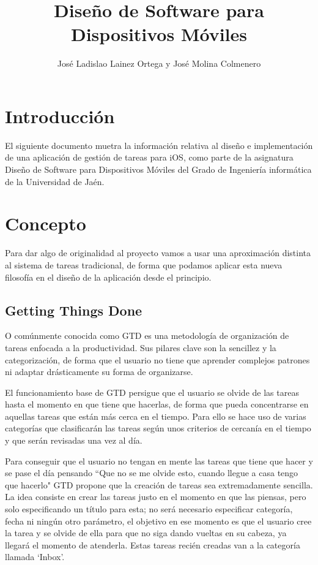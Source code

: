 \documentclass[parskip=half*]{scrartcl}
\title{Dise\~no de Software para Dispositivos M\'oviles}
\author{Jos\'e Ladislao Lainez Ortega y Jos\'e Molina Colmenero}
\begin{document}

\maketitle
\tableofcontents

\newpage


\section{Introducci\'on}
El siguiente documento muetra la informaci\'on relativa al dise\~no e implementaci\'on de una aplicaci\'on de gesti\'on de tareas para iOS, como parte de la asignatura Dise\~no de Software para Dispositivos M\'oviles del Grado de Ingenier\'ia inform\'atica de la Universidad de Ja\'en.

\section{Concepto}
Para dar algo de originalidad al proyecto vamos a usar una aproximaci\'on distinta al sistema de tareas tradicional, de forma que podamos aplicar esta nueva filosof\'ia en el dise\~no de la aplicaci\'on desde el principio.

\subsection{Getting Things Done}
O com\'unmente conocida como GTD es una metodolog\'ia de organizaci\'on de tareas enfocada a la productividad. Sus pilares clave son la sencillez y la categorizaci\'on, de forma que el usuario no tiene que aprender complejos patrones ni adaptar dr\'asticamente su forma de organizarse.

El funcionamiento base de GTD persigue que el usuario se olvide de las tareas hasta el momento en que tiene que hacerlas, de forma que pueda concentrarse en aquellas tareas que est\'an m\'as cerca en el tiempo. Para ello se hace uso de varias categor\'ias que clasificar\'an las tareas seg\'un unos criterios de cercan\'ia en el tiempo y que ser\'an revisadas una vez al d\'ia.

Para conseguir que el usuario no tengan en mente las tareas que tiene que hacer y se pase el d\'ia pensando ``Que no se me olvide esto, cuando llegue a casa tengo que hacerlo" GTD propone que la creaci\'on de tareas sea extremadamente sencilla. La idea consiste en crear las tareas justo en el momento en que las piensas, pero solo especificando un t\'itulo para esta; no ser\'a necesario especificar categor\'ia, fecha ni ning\'un otro par\'ametro, el objetivo en ese momento es que el usuario cree la tarea y se olvide de ella para que no siga dando vueltas en su cabeza, ya llegar\'a el momento de atenderla. Estas tareas reci\'en creadas van a la categor\'ia llamada `Inbox'.
\end{document}
